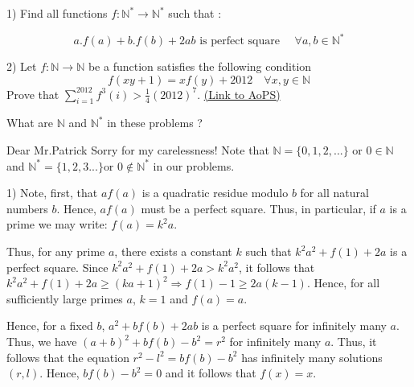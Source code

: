\begin{problem}
	1) Find all functions $f:\mathbb{N}^{*}\to \mathbb{N}^{*}$ such that :

\[a.f(a)+b.f(b)+2ab\,\,\text{is perfect square } \quad \forall  a,b\in \mathbb{N}^{*}\]


2)   Let $f:\mathbb{N}\rightarrow \mathbb{N}$ be a function satisfies the following condition
 \[f\left ( xy+1 \right )=xf\left ( y \right )+2012\quad \forall x,y\in \mathbb{N}\]
Prove that $\sum_{i=1}^{2012}f^{3}\left ( i \right )>\frac{1}{4}\left ( 2012 \right )^{7}$.
	\flushright \href{https://artofproblemsolving.com/community/c6h564345}{(Link to AoPS)}
\end{problem}



\begin{solution}
	What are $\mathbb N$ and $\mathbb N^*$ in these problems ?
\end{solution}



\begin{solution}
	Dear Mr.Patrick
Sorry for my carelessness! 
Note that $\mathbb N=\{0,1,2,...\}$ or $ 0\in\mathbb N$ and $ \mathbb{N}^*=\{1,2,3...\} $or $ 0\notin \mathbb {N}^*$ in our problems.
\end{solution}



\begin{solution}
	1) Note, first, that $af(a)$ is a quadratic residue modulo $b$ for all natural numbers $b$. Hence, $af(a)$ must be a perfect square. Thus, in particular, if $a$ is a prime we may write: $f(a) = k^2a$.

Thus, for any prime $a$, there exists a constant $k$ such that  $k^2a^2 + f(1) + 2a$ is a perfect square. Since $k^2a^2 + f(1) + 2a > k^2a^2$, it follows that $k^2a^2 + f(1) + 2a \ge (ka +1)^2 \Rightarrow f(1) - 1 \ge 2a(k-1)$. Hence, for all sufficiently large primes $a$, $k = 1$ and $f(a) = a$.

Hence, for a fixed $b$, $a^2 + bf(b) + 2ab$ is a perfect square for infinitely many $a$. Thus, we have $(a + b)^2 + bf(b) - b^2 = r^2$ for infinitely many $a$. Thus, it follows that the equation $r^2 - l^2 = bf(b) - b^2$ has infinitely many solutions $(r, l)$. Hence, $bf(b) - b^2 = 0$ and it follows that $f(x) = x$.
\end{solution}



